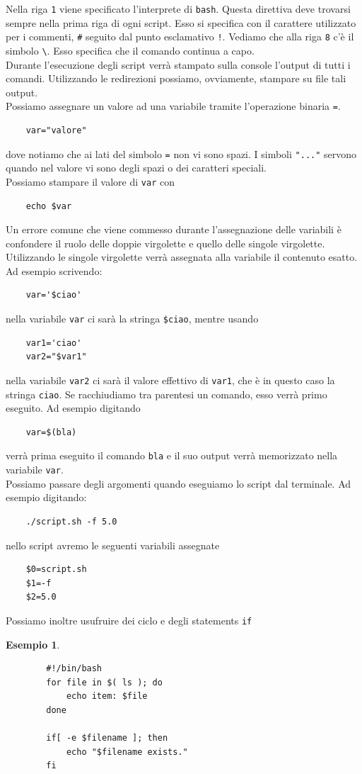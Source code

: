 \documentclass[11pt]{book}
\newtheorem{esempio}[section]{Esempio}
\begin{document}
Nella riga \verb*|1| viene specificato l'interprete di \verb*|bash|. Questa direttiva deve trovarsi sempre nella prima riga di ogni script. Esso si specifica con il carattere utilizzato per i commenti, \verb*|#| seguito dal punto esclamativo \verb*|!|. Vediamo che alla riga \verb*|8| c'è il simbolo \verb*|\|. Esso specifica che il comando continua a capo. \\
Durante l'esecuzione degli script verrà stampato sulla console l'output di tutti i comandi. Utilizzando le redirezioni possiamo, ovviamente, stampare su file tali output. \\
Possiamo assegnare un valore ad una variabile tramite l'operazione binaria \verb*|=|. 
\begin{verbatim}
	var="valore"
\end{verbatim}
dove notiamo che ai lati del simbolo \verb*|=| non vi sono spazi. I simboli \verb*|"..."| servono quando nel valore vi sono degli spazi o dei caratteri speciali. \\
Possiamo stampare il valore di \verb*|var| con
\begin{verbatim}
	echo $var
\end{verbatim}	
Un errore comune che viene commesso durante l'assegnazione delle variabili è confondere il ruolo delle doppie virgolette e quello delle singole virgolette.\\
Utilizzando le singole virgolette verrà assegnata alla variabile il contenuto esatto. Ad esempio scrivendo:
\begin{verbatim}
	var='$ciao'
\end{verbatim}
nella variabile \verb*|var| ci sarà la stringa \verb*|$ciao|, mentre usando
\begin{verbatim}
	var1='ciao'
	var2="$var1"
\end{verbatim}
nella variabile \verb*|var2| ci sarà il valore effettivo di \verb*|var1|, che è in questo caso la stringa \verb*|ciao|. Se racchiudiamo tra parentesi un comando, esso verrà primo eseguito. Ad esempio digitando
\begin{verbatim}
	var=$(bla)
\end{verbatim}
verrà prima eseguito il comando \verb*|bla| e il suo output verrà memorizzato nella variabile \verb*|var|.\\
Possiamo passare degli argomenti quando eseguiamo lo script dal terminale. Ad esempio digitando:
\begin{verbatim}
	./script.sh -f 5.0
\end{verbatim}
nello script avremo le seguenti variabili assegnate
\begin{verbatim}
	$0=script.sh
	$1=-f
	$2=5.0
\end{verbatim}
Possiamo inoltre usufruire dei ciclo e degli statements \verb*|if|
\begin{esempio}
	\begin{verbatim}
		#!/bin/bash
		for file in $( ls ); do
			echo item: $file
		done
		
		if[ -e $filename ]; then
			echo "$filename exists."
		fi
	\end{verbatim}
\end{esempio}
\end{document}
